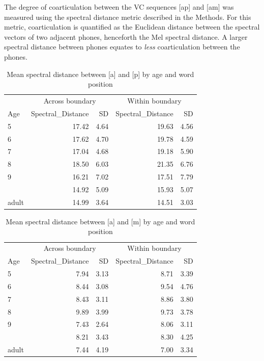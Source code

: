 \documentclass[
]{article}
\begin{document}
The degree of coarticulation between the VC sequences {[}ap{]} and {[}am{]} was measured using the spectral distance metric described in the Methods. For this metric, coarticulation is quantified as the Euclidean distance between the spectral vectors of two adjacent phones, henceforth the Mel spectral distance. A larger spectral distance between phones equates to \emph{less} coarticulation between the phones.

\begin{table}

\caption{\label{tab:ap-coartic-tbl}Mean spectral distance between [a] and [p] by age and word position}
\centering
\begin{tabular}[t]{lrrrr}
\toprule
\multicolumn{1}{c}{ } & \multicolumn{2}{c}{Across boundary} & \multicolumn{2}{c}{Within boundary} \\
\cmidrule(l{3pt}r{3pt}){2-3} \cmidrule(l{3pt}r{3pt}){4-5}
Age & Spectral\_Distance  & SD  & Spectral\_Distance & SD\\
\midrule
5 & 17.42 & 4.64 & 19.63 & 4.56\\
6 & 17.62 & 4.70 & 19.78 & 4.59\\
7 & 17.04 & 4.68 & 19.18 & 5.90\\
8 & 18.50 & 6.03 & 21.35 & 6.76\\
9 & 16.21 & 7.02 & 17.51 & 7.79\\
\addlinespace
10 & 14.92 & 5.09 & 15.93 & 5.07\\
adult & 14.99 & 3.64 & 14.51 & 3.03\\
\bottomrule
\end{tabular}
\end{table}

\begin{table}

\caption{\label{tab:am-coartic-tbl}Mean spectral distance between [a] and [m] by age and word position}
\centering
\begin{tabular}[t]{lrrrr}
\toprule
\multicolumn{1}{c}{ } & \multicolumn{2}{c}{Across boundary} & \multicolumn{2}{c}{Within boundary} \\
\cmidrule(l{3pt}r{3pt}){2-3} \cmidrule(l{3pt}r{3pt}){4-5}
Age & Spectral\_Distance  & SD  & Spectral\_Distance & SD\\
\midrule
5 & 7.94 & 3.13 & 8.71 & 3.39\\
6 & 8.44 & 3.08 & 9.54 & 4.76\\
7 & 8.43 & 3.11 & 8.86 & 3.80\\
8 & 9.89 & 3.99 & 9.73 & 3.78\\
9 & 7.43 & 2.64 & 8.06 & 3.11\\
\addlinespace
10 & 8.21 & 3.43 & 8.30 & 4.25\\
adult & 7.44 & 4.19 & 7.00 & 3.34\\
\bottomrule
\end{tabular}
\end{table}
\end{document}
